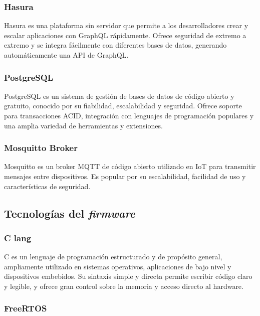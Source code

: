 \newpage
\subsubsection{Hasura}

Hasura \citep{hasura} es una plataforma sin servidor que permite a los desarrolladores crear y escalar aplicaciones con GraphQL rápidamente. Ofrece seguridad de extremo a extremo y se integra fácilmente con diferentes bases de datos, generando automáticamente una API de GraphQL.


\subsubsection{PostgreSQL}

PostgreSQL \citep{postgresql} es un sistema de gestión de bases de datos de código abierto y gratuito, conocido por su fiabilidad, escalabilidad y seguridad. Ofrece soporte para transacciones ACID, integración con lenguajes de programación populares y una amplia variedad de herramientas y extensiones.


\subsubsection{Mosquitto Broker}

Mosquitto \citep{mosquitto} es un broker MQTT de código abierto utilizado en IoT para transmitir mensajes entre dispositivos. Es popular por su escalabilidad, facilidad de uso y características de seguridad.


\subsection{Tecnologías del \textit{firmware}}


\subsubsection{C lang}

C \citep{c-lang} es un lenguaje de programación estructurado y de propósito general, ampliamente utilizado en sistemas operativos, aplicaciones de bajo nivel y dispositivos embebidos. Su sintaxis simple y directa permite escribir código claro y legible, y ofrece gran control sobre la memoria y acceso directo al hardware.


\subsubsection{FreeRTOS}

